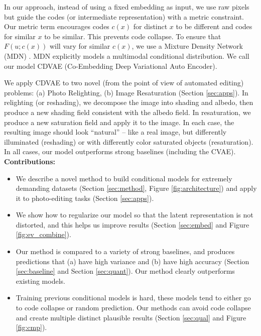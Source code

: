 \documentclass[10pt,twocolumn,letterpaper]{article}
\begin{document}
In our approach, instead of using a fixed embedding as input, we use raw pixels but guide 
the codes (or intermediate representation) with a metric constraint. Our metric term encourages codes $c(x)$ for 
distinct $x$ to be different and codes for similar $x$ to be similar. This prevents code 
collapse. To ensure that $F(u; c(x))$ will vary for similar $c(x)$, we use a Mixture Density 
Network (MDN) \cite{bishop1994mixture}. MDN explicitly models a multimodal conditional 
distribution. We call our model CDVAE (Co-Embedding Deep Variational Auto Encoder).

We apply CDVAE to two novel (from the point of view of automated editing) problems: (a) Photo Relighting, 
(b) Image Resaturation (Section \ref{sec:apps}). In relighting (or reshading), we decompose the image into shading and albedo, then produce a new shading 
field consistent with the albedo field. In resaturation, we produce a new saturation field and 
apply it to the image.  In each case, the resulting image should look ``natural'' -- like 
a real image, but differently illuminated (reshading) or with differently color saturated objects 
(resaturation).  In all cases, our model outperforms strong baselines 
(including the CVAE). \\


{\bf Contributions:}
\begin{itemize}
\item We describe a novel method to build conditional models for extremely demanding 
datasets (Section \ref{sec:method}, Figure \ref{fig:architecture}) and apply it to
photo-editing tasks (Section \ref{sec:apps}).  
\item We show how to regularize our model so that the latent representation is not distorted, and this helps us 
improve results (Section \ref{sec:embed} and Figure \ref{fig:ev_combine}). 
\item Our method is compared to a variety of strong baselines, and produces predictions that (a) have high variance and
  (b) have high accuracy (Section \ref{sec:baseline} and Section \ref{sec:quant}). Our method clearly outperforms existing models.
\item Training previous conditional models is hard, these models tend to either go to code collapse 
or random prediction. Our methods can avoid code collapse and create multiple distinct plausible results 
(Section \ref{sec:qual} and Figure \ref{fig:cmp}). 
\end{itemize}
\end{document}
